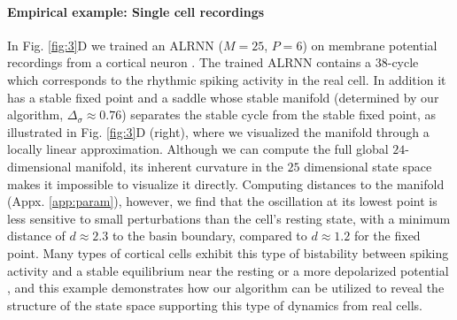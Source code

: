 \documentclass{article}
\theoremstyle{example}
\theoremstyle{plain}
\theoremstyle{definition}
\theoremstyle{remark}
\begin{document}
\paragraph{Empirical example: Single cell recordings}
In Fig. \ref{fig:3}D we trained an ALRNN ($M=25$, $P=6$) on membrane potential recordings from a cortical neuron \citep{hertag2012approximation}. The trained ALRNN contains a 38-cycle which corresponds to the rhythmic spiking activity in the real cell. In addition it has a stable fixed point and a saddle whose stable manifold (determined by our algorithm, $\Delta_{\sigma}\approx0.76$) separates the stable cycle from the stable fixed point, as illustrated in Fig. \ref{fig:3}D (right), where we visualized the manifold through a locally linear approximation. Although we can compute the full global $24$-dimensional manifold, its inherent curvature in the $25$ dimensional state space makes it impossible to visualize it directly. %
Computing distances to the manifold (Appx. \ref{app:param}), %
however, we find that the oscillation at its lowest point is less sensitive to small perturbations than the cell's resting state, with a minimum distance of $d\approx 2.3$ to the basin boundary, compared to $d\approx 1.2$ for the fixed point. 
Many types of cortical cells exhibit this type of bistability between spiking activity and a stable equilibrium near the resting or a more depolarized potential \citep{izhikevich2007dynamical,durstewitz2007dynamical}, and this example demonstrates how our algorithm can be utilized to reveal the structure of the state space supporting this type of dynamics from real cells.
\end{document}
